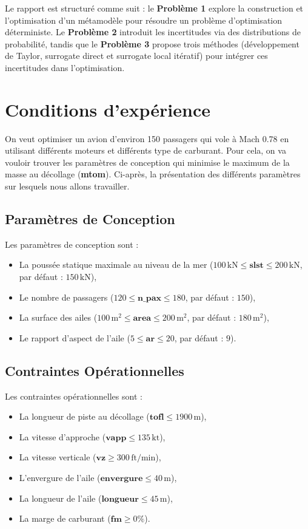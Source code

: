 \documentclass[a4paper, 11pt]{article}
\begin{document}
Le rapport est structuré comme suit : le \textbf{Problème 1} explore la construction et l’optimisation d’un métamodèle pour résoudre un problème d’optimisation déterministe. Le \textbf{Problème 2} introduit les incertitudes via des distributions de probabilité, tandis que le \textbf{Problème 3} propose trois méthodes (développement de Taylor, surrogate direct et surrogate local itératif) pour intégrer ces incertitudes dans l’optimisation. 

\section{Conditions d'expérience}

On veut optimiser un avion d'environ 150 passagers qui vole à Mach 0.78 en utilisant différents moteurs et différents type de carburant. Pour cela, on va vouloir trouver les paramètres de conception qui minimise le maximum de la masse au décollage (\textbf{mtom}).
Ci-après, la présentation des différents paramètres sur lesquels nous allons travailler.


\subsection{Paramètres de Conception}
Les paramètres de conception sont :
\begin{itemize}
    \item La poussée statique maximale au niveau de la mer (\(100 \, \text{kN} \leq \textbf{slst} \leq 200 \, \text{kN}\), par défaut : \(150 \, \text{kN}\)),
    \item Le nombre de passagers (\(120 \leq {\textbf{n\_pax}} \leq 180\), par défaut : \(150\)),
    \item La surface des ailes (\(100 \, \text{m}^2 \leq \textbf{area} \leq 200 \, \text{m}^2\), par défaut : \(180 \, \text{m}^2\)),
    \item Le rapport d'aspect de l'aile (\(5 \leq \textbf{ar} \leq 20\), par défaut : \(9\)).
\end{itemize}

\subsection{Contraintes Opérationnelles}
Les contraintes opérationnelles sont :
\begin{itemize}
    \item La longueur de piste au décollage (\(\textbf{tofl} \leq 1900 \, \text{m}\)),
    \item La vitesse d'approche (\(\textbf{vapp} \leq 135 \, \text{kt}\)),
    \item La vitesse verticale (\(\textbf{vz} \geq 300 \, \text{ft/min}\)),
    \item L'envergure de l'aile (\(\textbf{envergure} \leq 40 \, \text{m}\)),
    \item La longueur de l'aile (\(\textbf{longueur} \leq 45 \, \text{m}\)),
    \item La marge de carburant (\(\textbf{fm} \geq 0\%\)).
\end{itemize}
\end{document}
